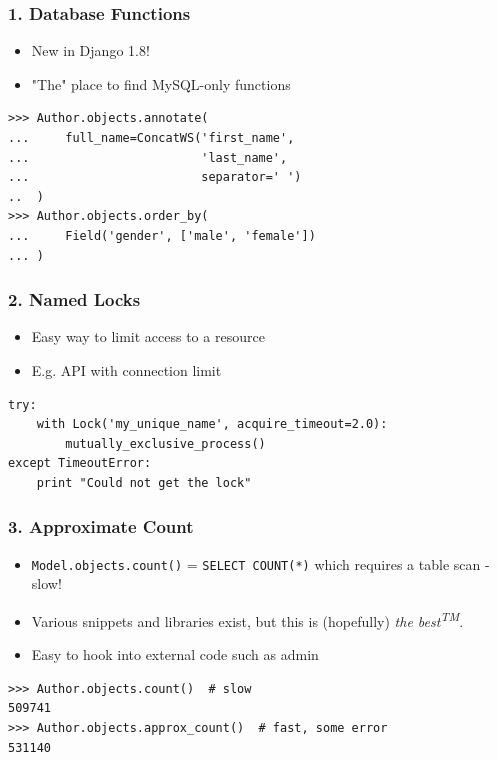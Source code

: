 \documentclass{beamer}
\begin{document}
\begin{frame}[fragile]\frametitle{1. Database Functions}

    \begin{itemize}
        \item New in Django 1.8!
        \item "The" place to find MySQL-only functions
    \end{itemize}


    \begin{lstlisting}
>>> Author.objects.annotate(
...     full_name=ConcatWS('first_name',
...                        'last_name',
...                        separator=' ')
..  )
>>> Author.objects.order_by(
...     Field('gender', ['male', 'female'])
... )
    \end{lstlisting}

\end{frame}


\begin{frame}[fragile]\frametitle{2. Named Locks}

    \begin{itemize}
        \item Easy way to limit access to a resource
        \item E.g. API with connection limit
    \end{itemize}


    \begin{lstlisting}
try:
    with Lock('my_unique_name', acquire_timeout=2.0):
        mutually_exclusive_process()
except TimeoutError:
    print "Could not get the lock"
    \end{lstlisting}

\end{frame}


\begin{frame}[fragile]\frametitle{3. Approximate Count}

    \begin{itemize}
        \item \texttt{Model.objects.count()} = \texttt{SELECT COUNT(*)}
              which requires a table scan - slow!
        \item Various snippets and libraries exist, but this is (hopefully)
              \textit{the best\textsuperscript{TM}}.
        \item Easy to hook into external code such as admin
    \end{itemize}


    \begin{lstlisting}
>>> Author.objects.count()  # slow
509741
>>> Author.objects.approx_count()  # fast, some error
531140
    \end{lstlisting}

\end{frame}
\end{document}
